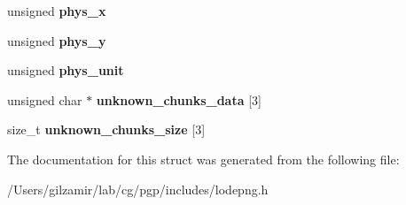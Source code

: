 \begin{DoxyCompactItemize}
\mbox{\label{struct_lode_p_n_g_info_a1593fa6e1acc93f3b9de51c340bef94d}} 
unsigned {\bfseries phys\+\_\+x}
\item 
\mbox{\label{struct_lode_p_n_g_info_a52ad7a105244d00f1e91c489eaf53f97}} 
unsigned {\bfseries phys\+\_\+y}
\item 
\mbox{\label{struct_lode_p_n_g_info_ad6f2171d9f87716e5010f6c5352f9855}} 
unsigned {\bfseries phys\+\_\+unit}
\item 
\mbox{\label{struct_lode_p_n_g_info_a8347476da7fc2fc6af4ec7ed44b638c6}} 
unsigned char $\ast$ {\bfseries unknown\+\_\+chunks\+\_\+data} \mbox{[}3\mbox{]}
\item 
\mbox{\label{struct_lode_p_n_g_info_a25a81d760759bd0383ae5a81ba83911d}} 
size\+\_\+t {\bfseries unknown\+\_\+chunks\+\_\+size} \mbox{[}3\mbox{]}
\end{DoxyCompactItemize}


The documentation for this struct was generated from the following file\+:\begin{DoxyCompactItemize}
\item 
/\+Users/gilzamir/lab/cg/pgp/includes/lodepng.\+h\end{DoxyCompactItemize}
